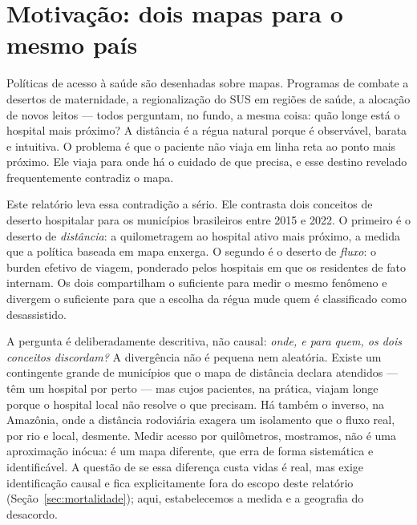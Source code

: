 
\section{Motivação: dois mapas para o mesmo país}
\label{sec:motivacao}

Políticas de acesso à saúde são desenhadas sobre mapas. Programas de combate a
desertos de maternidade, a regionalização do SUS em regiões de saúde, a alocação
de novos leitos --- todos perguntam, no fundo, a mesma coisa: quão longe está o
hospital mais próximo? A distância é a régua natural porque é observável,
barata e intuitiva. O problema é que o paciente não viaja em linha reta ao ponto
mais próximo. Ele viaja para onde há o cuidado de que precisa, e esse destino
revelado frequentemente contradiz o mapa.

Este relatório leva essa contradição a sério. Ele contrasta dois conceitos de
deserto hospitalar para os \valNmunic{} municípios brasileiros entre 2015 e 2022. O
primeiro é o deserto de \emph{distância}: a quilometragem ao hospital ativo mais
próximo, a medida que a política baseada em mapa enxerga. O segundo é o deserto
de \emph{fluxo}: o burden efetivo de viagem, ponderado pelos hospitais em que os
residentes de fato internam. Os dois compartilham o suficiente para medir o
mesmo fenômeno e divergem o suficiente para que a escolha da régua mude quem é
classificado como desassistido.

A pergunta é deliberadamente descritiva, não causal: \emph{onde, e para quem, os
dois conceitos discordam?} A divergência não é pequena nem aleatória. Existe um
contingente grande de municípios que o mapa de distância declara atendidos ---
têm um hospital por perto --- mas cujos pacientes, na prática, viajam longe
porque o hospital local não resolve o que precisam. Há também o inverso, na
Amazônia, onde a distância rodoviária exagera um isolamento que o fluxo real, por
rio e local, desmente. Medir acesso por quilômetros, mostramos, não é uma
aproximação inócua: é um mapa diferente, que erra de forma sistemática e
identificável. A questão de se essa diferença custa vidas é real, mas exige
identificação causal e fica explicitamente fora do escopo deste relatório
(Seção~\ref{sec:mortalidade}); aqui, estabelecemos a medida e a geografia do
desacordo.
